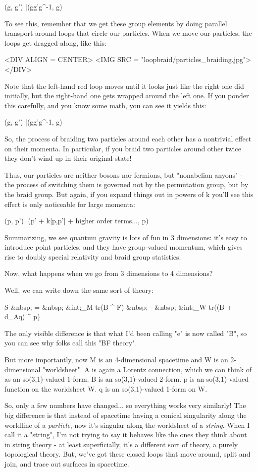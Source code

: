 (g, g') |\to  (gg'g^{-1}, g)

To see this, remember that we get these group elements by doing
parallel transport around loops that circle our particles.  When
we move our particles, the loops get dragged along, like this:

<DIV ALIGN = CENTER>
<IMG SRC = "loopbraid/particles_braiding.jpg">
</DIV>

Note that the left-hand red loop moves until it looks just
like the right one did initially, but the right-hand one gets
wrapped around the left one.  If you ponder this carefully, 
and you know some math, you can see it yields this:

(g, g') |\to  (gg'g^{-1}, g)

So, the process of braiding two particles around each other has a
nontrivial effect on their momenta.  In particular, if you braid two
particles around other twice they don't wind up in their original
state!  

Thus, our particles are neither bosons nor fermions, but
"nonabelian anyons" - the process of switching them is
governed not by the permutation group, but by the braid group.  
But again, if you expand things out in powers of k you'll see this 
effect is only noticeable for large momenta:

(p, p') |\to  (p' + k[p,p'] + higher order terms..., p)

Summarizing, we see quantum gravity is lots of fun in 3 dimensions:
it's easy to introduce point particles, and they have group-valued
momentum, which gives rise to doubly special relativity and braid
group statistics.

Now, what happens when we go from 3 dimensions to 4 dimensions?

Well, we can write down the same sort of theory:

S &nbsp; = &nbsp; 
&int;_{M}  tr(B ^ F) &nbsp; - &nbsp;
&int;_{W}  tr((B + d_{A}q) ^ p)

The only visible difference is that what I'd been calling
"e" is now called "B", so you can see why folks
call this "BF theory". 

But more importantly, now M is an 4-dimensional spacetime and W is an 
2-dimensional "worldsheet".  A is again a Lorentz connection, which 
we can think of as an so(3,1)-valued 1-form.   B is an so(3,1)-valued 
2-form.  p is an so(3,1)-valued function on the worldsheet W.  q is an 
so(3,1)-valued 1-form on W.

So, only a few numbers have changed... so everything works very
similarly!  The big difference is that instead of spacetime having a
conical singularity along the worldline of a \emph{particle}, now
it's singular along the worldsheet of a \emph{string}.  When I call
it a "string", I'm not trying to say it behaves like the
ones they think about in string theory - at least superficially, it's
a different sort of theory, a purely topological theory. But, we've
got these closed loops that move around, split and join, and trace out
surfaces in spacetime.

